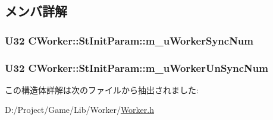 \subsection{メンバ詳解}
\hypertarget{struct_c_worker_1_1_st_init_param_a12eae4f2ebb11c75f35a7d79811312cd}{}
\subsubsection[{m\+\_\+u\+Worker\+Sync\+Num}]{\setlength{\rightskip}{0pt plus 5cm}U32 C\+Worker\+::\+St\+Init\+Param\+::m\+\_\+u\+Worker\+Sync\+Num}\label{struct_c_worker_1_1_st_init_param_a12eae4f2ebb11c75f35a7d79811312cd}
\hypertarget{struct_c_worker_1_1_st_init_param_a41be25673705539bf09d8f287d7d19f3}{}
\subsubsection[{m\+\_\+u\+Worker\+Un\+Sync\+Num}]{\setlength{\rightskip}{0pt plus 5cm}U32 C\+Worker\+::\+St\+Init\+Param\+::m\+\_\+u\+Worker\+Un\+Sync\+Num}\label{struct_c_worker_1_1_st_init_param_a41be25673705539bf09d8f287d7d19f3}


この構造体詳解は次のファイルから抽出されました\+:\begin{DoxyCompactItemize}
\item 
D\+:/\+Project/\+Game/\+Lib/\+Worker/\hyperlink{_worker_8h}{Worker.\+h}\end{DoxyCompactItemize}
